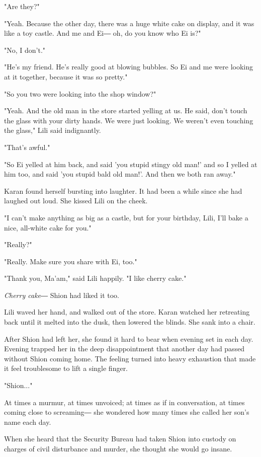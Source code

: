 "Are they?"

"Yeah. Because the other day, there was a huge white cake on display,
and it was like a toy castle. And me and Ei― oh, do you know who Ei is?"

"No, I don't."

"He's my friend. He's really good at blowing bubbles. So Ei and me were
looking at it together, because it was so pretty."

"So you two were looking into the shop window?"

"Yeah. And the old man in the store started yelling at us. He said,
don't touch the glass with your dirty hands. We were just looking. We
weren't even touching the glass," Lili said indignantly.

"That's awful."

"So Ei yelled at him back, and said 'you stupid stingy old man!' and so
I yelled at him too, and said 'you stupid bald old man!'. And then we
both ran away."

Karan found herself bursting into laughter. It had been a while since
she had laughed out loud. She kissed Lili on the cheek.

"I can't make anything as big as a castle, but for your birthday, Lili,
I'll bake a nice, all-white cake for you."

"Really?"

"Really. Make sure you share with Ei, too."

"Thank you, Ma'am," said Lili happily. "I like cherry cake."

\emph{Cherry cake―} Shion had liked it too.

Lili waved her hand, and walked out of the store. Karan watched her
retreating back until it melted into the dusk, then lowered the blinds.
She sank into a chair.

After Shion had left her, she found it hard to bear when evening set in
each day. Evening trapped her in the deep disappointment that another
day had passed without Shion coming home. The feeling turned into heavy
exhaustion that made it feel troublesome to lift a single finger.

"Shion..."

At times a murmur, at times unvoiced; at times as if in conversation, at
times coming close to screaming― she wondered how many times she called
her son's name each day.

When she heard that the Security Bureau had taken Shion into custody on
charges of civil disturbance and murder, she thought she would go
insane.

